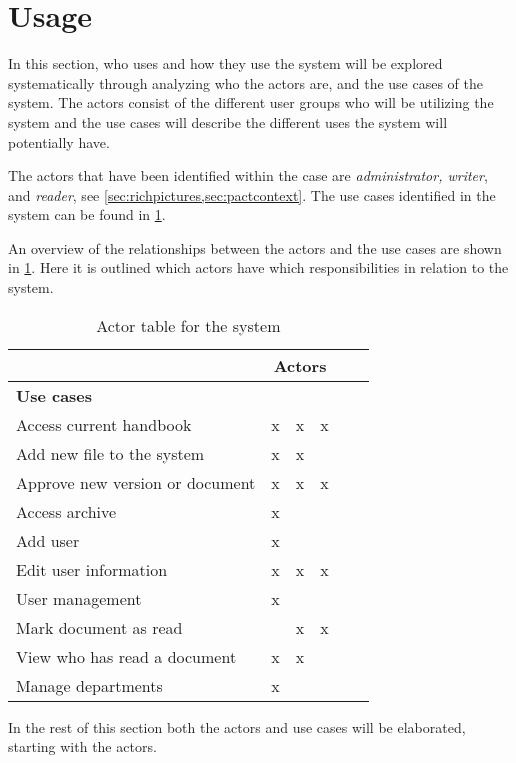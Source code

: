 \section{Usage}\label{sec:Usage}
In this section, who uses and how they use the system will be explored systematically through analyzing who the actors are, and the use cases of the system.
The actors consist of the different user groups who will be utilizing the system and the use cases will describe the different uses the system will potentially have.

The actors that have been identified within the case are \textit{administrator, writer}, and \textit{reader}, see \cref{sec:richpictures,sec:pactcontext}.
The use cases identified in the system can be found in \cref{tab:ActorTable}.

An overview of the relationships between the actors and the use cases are shown in \cref{tab:ActorTable}.
Here it is outlined which actors have which responsibilities in relation to the system.

\begin{table}[H]
	\begin{center}
	\begin{tabular}{| l | c | c | c | c | c |}
		\hline
		& \multicolumn{3}{c|}{\textbf{Actors}} \\
		\hline
		\textbf{Use cases} & \rotatebox{90}{Administrator }  & \rotatebox{90}{Writer} & \rotatebox{90}{Reader} \\
		\hline
		Access current handbook & x & x & x \\
		\hline
		Add new file to the system & x & x & \\
		\hline
		Approve new version or document & x & x & x \\
		\hline
		Access archive & x & & \\
		\hline
		Add user & x & & \\
		\hline
		Edit user information & x & x & x\\
		\hline
		User management & x & & \\
		\hline
		Mark document as read & & x & x \\
		\hline
		View who has read a document & x & x & \\
		\hline
		Manage departments & x & & \\
		\hline
	\end{tabular}
	\end{center}
	\caption{Actor table for the system}\label{tab:ActorTable}
\end{table}

In the rest of this section both the actors and use cases will be elaborated, starting with the actors.
